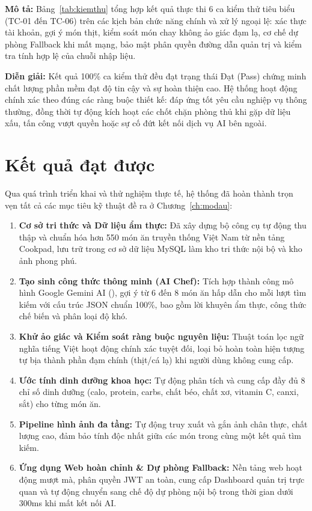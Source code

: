 \noindent\textbf{Mô tả:} Bảng~\ref{tab:kiemthu} tổng hợp kết quả thực thi 6 ca kiểm thử tiêu biểu (TC-01 đến TC-06) trên các kịch bản chức năng chính và xử lý ngoại lệ: xác thực tài khoản, gợi ý món thịt, kiểm soát món chay không ảo giác đạm lạ, cơ chế dự phòng Fallback khi mất mạng, bảo mật phân quyền đường dẫn quản trị và kiểm tra tính hợp lệ của chuỗi nhập liệu.

\noindent\textbf{Diễn giải:} Kết quả 100\% ca kiểm thử đều đạt trạng thái Đạt (Pass) chứng minh chất lượng phần mềm đạt độ tin cậy và sự hoàn thiện cao. Hệ thống hoạt động chính xác theo đúng các ràng buộc thiết kế: đáp ứng tốt yêu cầu nghiệp vụ thông thường, đồng thời tự động kích hoạt các chốt chặn phòng thủ khi gặp dữ liệu xấu, tấn công vượt quyền hoặc sự cố đứt kết nối dịch vụ AI bên ngoài.

\section{Kết quả đạt được}

Qua quá trình triển khai và thử nghiệm thực tế, hệ thống đã hoàn thành trọn vẹn tất cả các mục tiêu kỹ thuật đề ra ở Chương~\ref{ch:modau}:
\begin{enumerate}[leftmargin=1.6em, itemsep=2pt]
  \item \textbf{Cơ sở tri thức và Dữ liệu ẩm thực:} Đã xây dựng bộ công cụ tự động thu thập và chuẩn hóa hơn 550 món ăn truyền thống Việt Nam từ nền tảng Cookpad, lưu trữ trong cơ sở dữ liệu MySQL làm kho tri thức nội bộ và kho ảnh phong phú.
  \item \textbf{Tạo sinh công thức thông minh (AI Chef):} Tích hợp thành công mô hình Google Gemini AI (), gợi ý từ 6 đến 8 món ăn hấp dẫn cho mỗi lượt tìm kiếm với cấu trúc JSON chuẩn 100\%, bao gồm lời khuyên ẩm thực, công thức chế biến và phân loại độ khó.
  \item \textbf{Khử ảo giác và Kiểm soát ràng buộc nguyên liệu:} Thuật toán lọc ngữ nghĩa tiếng Việt hoạt động chính xác tuyệt đối, loại bỏ hoàn toàn hiện tượng tự bịa thành phần đạm chính (thịt/cá lạ) khi người dùng không cung cấp.
  \item \textbf{Ước tính dinh dưỡng khoa học:} Tự động phân tích và cung cấp đầy đủ 8 chỉ số dinh dưỡng (calo, protein, carbs, chất béo, chất xơ, vitamin C, canxi, sắt) cho từng món ăn.
  \item \textbf{Pipeline hình ảnh đa tầng:} Tự động truy xuất và gắn ảnh chân thực, chất lượng cao, đảm bảo tính độc nhất giữa các món trong cùng một kết quả tìm kiếm.
  \item \textbf{Ứng dụng Web hoàn chỉnh \& Dự phòng Fallback:} Nền tảng web hoạt động mượt mà, phân quyền JWT an toàn, cung cấp Dashboard quản trị trực quan và tự động chuyển sang chế độ dự phòng nội bộ trong thời gian dưới 300ms khi mất kết nối AI.
\end{enumerate}

